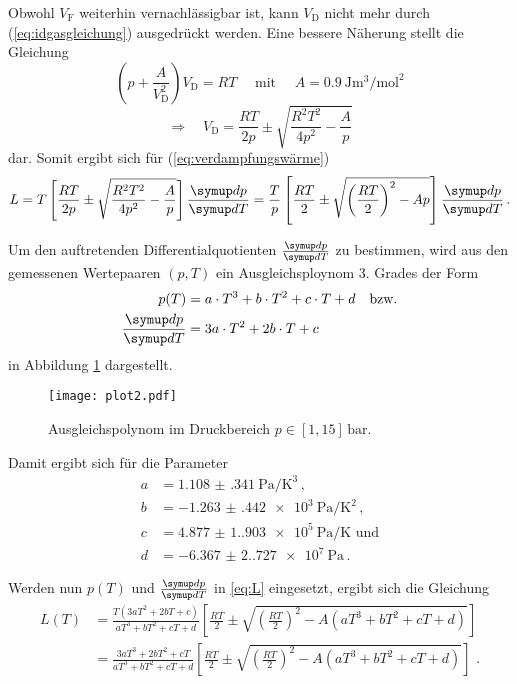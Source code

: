 Obwohl $V_\text{F}$ weiterhin vernachlässigbar ist, kann $V_\text{D}$ nicht mehr durch (\ref{eq:idgasgleichung})
ausgedrückt werden.
Eine bessere Näherung stellt die Gleichung
\begin{equation}
    \left(p + \frac {A} {V_{\text{D}}^{2}}\right) V_{\text{D}} = RT 
    \quad \text { mit } \quad
    A = \qty[per-mode=fraction]{0.9}{\joule\m\cubed\per\mol\squared} 
\end{equation}
\begin{equation}
    \Rightarrow \quad V_{\text{D}} = \frac{RT}{2p} \pm \sqrt{ \frac {R^{2} T^{2}} {4 p^{2}} - \frac{A}{p} } 
\end{equation}
dar. Somit ergibt sich für (\ref{eq:verdampfungswärme}) 
\begin{equation}
    L = T\left[\frac{R T}{2 p} \pm \sqrt{\frac{R^{2} T^{2}}{4 p^{2}}-\frac{A}{p}}\right] \frac{\dif{p}}{\dif{T}} 
    = \frac{T}{p} \left[\frac{R T}{2} \pm \sqrt{\left(\frac{R T}{2}\right)^{2}-A p}\right] \frac{\dif{p}}{\dif{T}} \, .
    \label{eq:L}
\end{equation}

Um den auftretenden Differentialquotienten $\frac{\dif{p}}{\dif{T}}$ zu bestimmen,
wird aus den gemessenen Wertepaaren $(p,T)$ ein Ausgleichsploynom 3. Grades der Form
\begin{align*}
    p(T) &= a \cdot T^{3} + b \cdot T^{2} + c \cdot T+d \quad \text{bzw.} \\
    \frac{\dif{p}}{\dif{T}} &= 3a \cdot T^{2} + 2b \cdot T + c \quad 
\end{align*}
in Abbildung \ref{fig:plot2} dargestellt.
\begin{figure}[H]
    \centering
    \texttt{[image: plot2.pdf]}
    \caption{Ausgleichspolynom im Druckbereich $p \in [1, 15] \, \mathrm{bar}$.}
    \label{fig:plot2}
\end{figure}

Damit ergibt sich für die Parameter
\begin{align*}
    a &= \qty{1.108(341)}{\pascal\per\cubic\kelvin} \, , \\
    b &= \qty{-1.263(442)e3}{\pascal\per\kelvin\squared} \, , \\ %
    c &= \qty{4.877(1.903)e5}{\pascal\per\kelvin} \, \, \text{und} \\ %
    d &= \qty{-6.367(2.727)e7}{\pascal} \, . %
\end{align*}

Werden nun $p(T)$ und $\frac{\dif{p}}{\dif{T}}$ in \ref{eq:L} eingesetzt, 
ergibt sich die Gleichung 
\begin{align}
    L(T) &= \frac{T \left(3 a T^{2}+2 b T+c\right)}{a T^{3}+b T^{2}+c T+d} \left[\frac{R T}{2} \pm \sqrt{\left(\frac{R T}{2}\right)^{2}-A \left(a T^{3}+b T^{2}+c T+d\right)}\right]  \\
    &= \frac{3 a T^{3}+2 b T^{2}+c T}{a T^{3}+b T^{2}+c T+d} \left[\frac{R T}{2} \pm \sqrt{\left(\frac{R T}{2}\right)^{2}-A\left(a T^{3}+b T^{2}+c T+d\right)}\right] \text{ .}
\end{align}

